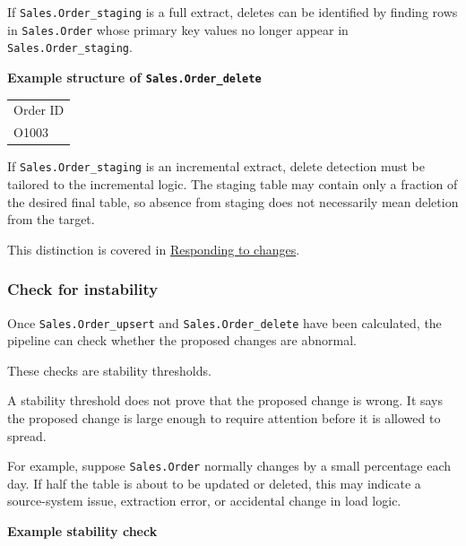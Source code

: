 \documentclass[10pt,openany,10pt]{book}
\newcounter{none}
\let\podeToprule\toprule
\let\podeMidrule\midrule
\let\podeBottomrule\bottomrule
\renewcommand{\toprule}{\arrayrulecolor{pbiGrid}\podeToprule}
\renewcommand{\midrule}{\arrayrulecolor{pbiGrid}\podeMidrule}
\renewcommand{\bottomrule}{\arrayrulecolor{pbiGrid}\podeBottomrule}
\begin{document}
If \texttt{Sales.Order\_staging} is a full extract, deletes can be
identified by finding rows in \texttt{Sales.Order} whose primary key
values no longer appear in \texttt{Sales.Order\_staging}.

\textbf{Example structure of \texttt{Sales.Order\_delete}}

{\def\LTcaptype{none} %
\begin{longtable}[]{@{}l@{}}
\toprule\noalign{}
Order ID \\
\midrule\noalign{}
\endhead
\bottomrule\noalign{}
\endlastfoot
O1003 \\
\end{longtable}
}

If \texttt{Sales.Order\_staging} is an incremental extract, delete
detection must be tailored to the incremental logic. The staging table
may contain only a fraction of the desired final table, so absence from
staging does not necessarily mean deletion from the target.

This distinction is covered in
\href{/docs/efficient-stable-pipeline/responding-to-changes/}{Responding
to changes}.

\subsubsection{Check for instability}\label{check-for-instability}

Once \texttt{Sales.Order\_upsert} and \texttt{Sales.Order\_delete} have
been calculated, the pipeline can check whether the proposed changes are
abnormal.

These checks are stability thresholds.

A stability threshold does not prove that the proposed change is wrong.
It says the proposed change is large enough to require attention before
it is allowed to spread.

For example, suppose \texttt{Sales.Order} normally changes by a small
percentage each day. If half the table is about to be updated or
deleted, this may indicate a source-system issue, extraction error, or
accidental change in load logic.

\textbf{Example stability check}
\end{document}
